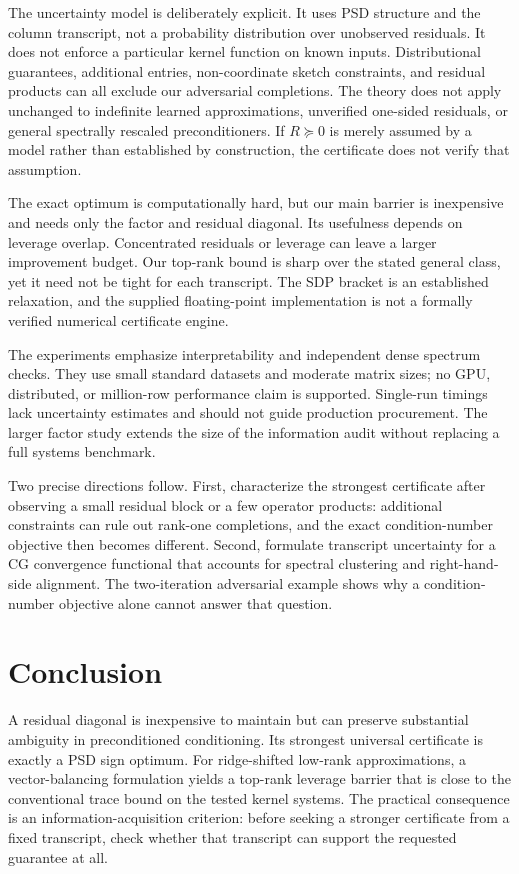 \documentclass[final,leqno,letterpaper]{etna}
\begin{document}
The uncertainty model is deliberately explicit. It uses PSD structure and the column transcript, not a probability distribution over unobserved residuals. It does not enforce a particular kernel function on known inputs. Distributional guarantees, additional entries, non-coordinate sketch constraints, and residual products can all exclude our adversarial completions. The theory does not apply unchanged to indefinite learned approximations, unverified one-sided residuals, or general spectrally rescaled preconditioners. If $R\succeq0$ is merely assumed by a model rather than established by construction, the certificate does not verify that assumption.

The exact optimum is computationally hard, but our main barrier is inexpensive and needs only the factor and residual diagonal. Its usefulness depends on leverage overlap. Concentrated residuals or leverage can leave a larger improvement budget. Our top-rank bound is sharp over the stated general class, yet it need not be tight for each transcript. The SDP bracket is an established relaxation, and the supplied floating-point implementation is not a formally verified numerical certificate engine.

The experiments emphasize interpretability and independent dense spectrum checks. They use small standard datasets and moderate matrix sizes; no GPU, distributed, or million-row performance claim is supported. Single-run timings lack uncertainty estimates and should not guide production procurement. The larger factor study extends the size of the information audit without replacing a full systems benchmark.

Two precise directions follow. First, characterize the strongest certificate after observing a small residual block or a few operator products: additional constraints can rule out rank-one completions, and the exact condition-number objective then becomes different. Second, formulate transcript uncertainty for a CG convergence functional that accounts for spectral clustering and right-hand-side alignment. The two-iteration adversarial example shows why a condition-number objective alone cannot answer that question.

\section{Conclusion}
A residual diagonal is inexpensive to maintain but can preserve substantial ambiguity in preconditioned conditioning. Its strongest universal certificate is exactly a PSD sign optimum. For ridge-shifted low-rank approximations, a vector-balancing formulation yields a top-rank leverage barrier that is close to the conventional trace bound on the tested kernel systems. The practical consequence is an information-acquisition criterion: before seeking a stronger certificate from a fixed transcript, check whether that transcript can support the requested guarantee at all.
\end{document}
